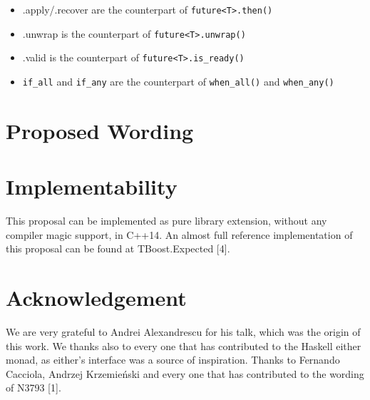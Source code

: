 \documentclass[a4paper,10pt]{article}
\newcommand{\cpp}[1]{\lstinline{#1}}
\begin{document}
\begin{itemize}
 \item .apply/.recover are the counterpart of \cpp{future<T>.then()}
 \item .unwrap is the counterpart of \cpp{future<T>.unwrap()}
 \item .valid is the counterpart of \cpp{future<T>.is_ready()}
 \item \cpp{if_all} and \cpp{if_any} are the counterpart of \cpp{when_all()} and \cpp{when_any()}
\end{itemize}

\section{Proposed Wording}

\section{Implementability}
This proposal can be implemented as pure library extension, without any compiler magic support, in C++14. An almost full reference implementation of this proposal can be found at TBoost.Expected [4]. 
\section{Acknowledgement}

We are very grateful to Andrei Alexandrescu for his talk, which was the origin of this work.
We thanks also to every one that has contributed to the Haskell either monad, as either's interface was a source of inspiration.
Thanks to Fernando Cacciola, Andrzej Krzemieński and every one that has contributed to the wording of N3793 [1].

\newpage
{}

\end{document}
